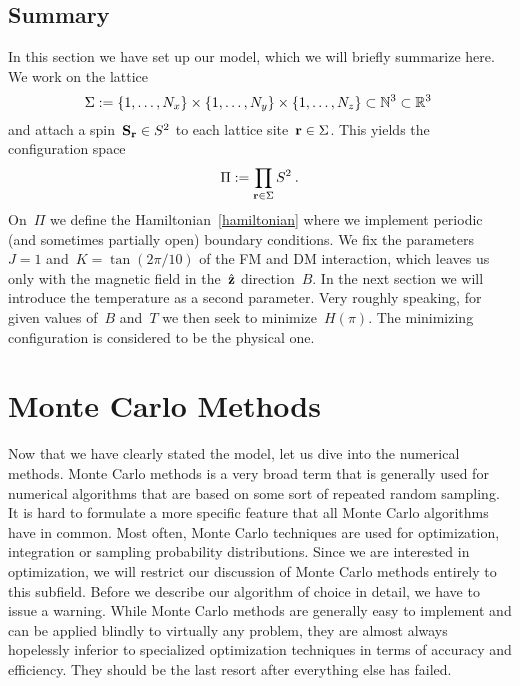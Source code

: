 \subsection{Summary}

In this section we have set up our model, which we will briefly summarize here.
We work on the lattice
%
\begin{equation}
  \Sigma := \{1,\dots,N_x\} \times \{1,\dots,N_y\} \times
  \{1,\dots,N_z\} \subset \mathbb{N}^3 \subset \mathbb{R}^3\:
\end{equation}
%
and attach a spin~$\mathbf{S}_{\mathbf{r}} \in S^2$ to each lattice site~$\mathbf{r} \in \Sigma$. This
yields the configuration space
%
\begin{equation}
  \Pi := \prod_{\mathbf{r} \in \Sigma} S^2\:.
\end{equation}
%
On~$\Pi$ we define the Hamiltonian~\eqref{hamiltonian} where we implement
periodic (and sometimes partially open) boundary conditions. We fix the
parameters~$J=1$ and~$K=\tan(2\pi / 10)$ of the FM and DM interaction, which
leaves us only with the magnetic field in the~$\hat{\mathbf{z}}$ direction~$B$. In the next
section we will introduce the temperature as a second parameter. Very
roughly speaking, for given values of~$B$ and~$T$ we then seek to
minimize~$H(\pi)$. The minimizing configuration is considered to be the physical
one.


%
\section{Monte Carlo Methods}\label{sec:mctheory}
%
Now that we have clearly stated the model, let us dive into the numerical
methods. Monte Carlo methods is a very broad term that is generally used for
numerical algorithms that are based on some sort of repeated random sampling. It
is hard to formulate a more specific feature that all Monte Carlo algorithms
have in common. Most often, Monte Carlo techniques are used for optimization,
integration or sampling probability distributions. Since we are interested in
optimization, we will restrict our discussion of Monte Carlo methods entirely to
this subfield. Before we describe our algorithm of choice in detail, we have to
issue a warning. While Monte Carlo methods are generally easy to implement and
can be applied blindly to virtually any problem, they are almost always
hopelessly inferior to specialized optimization techniques in terms of accuracy
and efficiency. They should be the last resort after everything else has failed.

